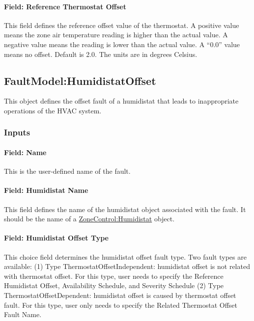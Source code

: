 \paragraph{Field: Reference Thermostat Offset}\label{field-reference-thermostat-offset}

This field defines the reference offset value of the thermostat. A positive value means the zone air temperature reading is higher than the actual value. A negative value means the reading is lower than the actual value. A ``0.0'' value means no offset. Default is 2.0. The units are in degrees Celsius.

\subsection{FaultModel:HumidistatOffset}\label{faultmodelhumidistatoffset}

This object defines the offset fault of a humidistat that leads to inappropriate operations of the HVAC system.

\subsubsection{Inputs}\label{inputs-7-015}

\paragraph{Field: Name}\label{field-name-7-011}

This is the user-defined name of the fault.

\paragraph{Field: Humidistat Name}\label{field-humidistat-name}

This field defines the name of the humidistat object associated with the fault. It should be the name of a \hyperref[zonecontrolhumidistat]{ZoneControl:Humidistat} object.

\paragraph{Field: Humidistat Offset Type}\label{field-humidistat-offset-type}

This choice field determines the humidistat offset fault type. Two fault types are available: (1) Type ThermostatOffsetIndependent: humidistat offset is not related with thermostat offset. For this type, user needs to specify the Reference Humidistat Offset, Availability Schedule, and Severity Schedule (2) Type ThermostatOffsetDependent: humidistat offset is caused by thermostat offset fault. For this type, user only needs to specify the Related Thermostat Offset Fault Name.

